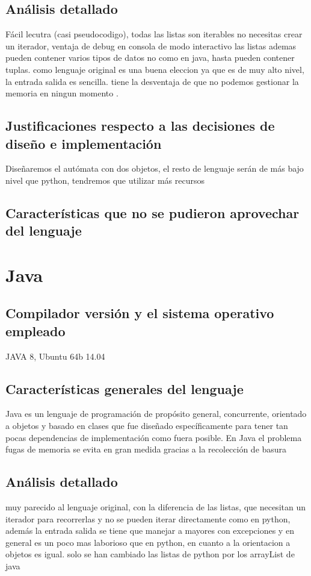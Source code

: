 \documentclass[12pt,a4paper]{article}
\begin{document}
  \subsection{Análisis detallado}
  Fácil lecutra (casi pseudocodigo), todas las listas son iterables no necesitas crear un iterador, ventaja de debug en consola de modo interactivo
  las listas ademas pueden contener varios tipos de datos no como en java, hasta pueden contener tuplas. como lenguaje original es una buena eleccion ya
   que es de muy alto nivel, la entrada salida es sencilla. tiene la desventaja de que no podemos gestionar la memoria en ningun momento .
    
  \subsection{Justificaciones respecto a las decisiones de diseño e implementación}
  Diseñaremos el autómata con dos objetos, el resto de lenguaje serán de más bajo nivel que python, tendremos que utilizar más recursos
  \subsection{Características que no se pudieron aprovechar del lenguaje}
  \section{Java}
   \subsection{Compilador versión y el sistema operativo empleado}
   JAVA 8, Ubuntu 64b 14.04
    \subsection{Características generales del lenguaje}
    Java es un lenguaje de programación de propósito general, concurrente, orientado a objetos y basado en clases que fue diseñado específicamente para tener tan pocas dependencias de implementación como fuera posible.
    En Java el problema fugas de memoria se evita en gran medida gracias a la recolección de basura
    \subsection{Análisis detallado}
    muy parecido al lenguaje original, con la diferencia de las listas, que necesitan un iterador para recorrerlas y no se pueden iterar
    directamente como en python, además la entrada salida se tiene que manejar a mayores con excepciones y en general es un poco mas laborioso que
    en python, en cuanto a la orientacion a objetos es igual. solo se han cambiado las listas de python por los arrayList de java
\end{document}
